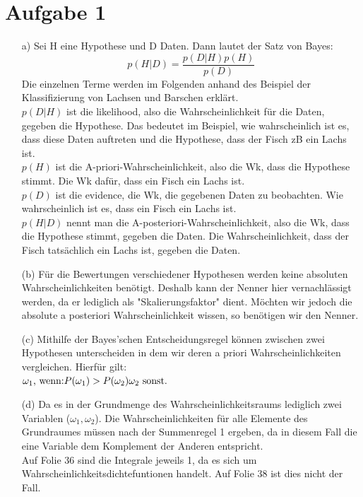 \documentclass[a4paper]{scrartcl}
\begin{document}
	
	\section*{Aufgabe 1}
	
	\begin{itemize} 
		
		\item[a)] Sei H eine Hypothese und D Daten. Dann lautet der Satz von Bayes: $$p(H|D) = \frac{p(D|H)p(H)}{p(D)}$$
		Die einzelnen Terme werden im Folgenden anhand des Beispiel der Klassifizierung von Lachsen und Barschen erklärt.\\
		$p(D|H)$ ist die likelihood, also die Wahrscheinlichkeit für die Daten, gegeben die Hypothese. Das bedeutet im Beispiel, wie wahrscheinlich ist es, dass diese Daten auftreten und die Hypothese, dass der Fisch zB ein Lachs ist.\\
		$p(H)$ ist die A-priori-Wahrscheinlichkeit, also die Wk, dass die Hypothese stimmt. Die Wk dafür, dass ein Fisch ein Lachs ist.\\
		$p(D)$ ist die evidence, die Wk, die gegebenen Daten zu beobachten. Wie wahrscheinlich ist es, dass ein Fisch ein Lachs ist.\\
		$p(H|D)$ nennt man die A-posteriori-Wahrscheinlichkeit, also die Wk, dass die Hypothese stimmt, gegeben die Daten. Die Wahrscheinlichkeit, dass der Fisch tatsächlich ein Lachs ist, gegeben die Daten.
		
		
		\item[(b)] Für die Bewertungen verschiedener Hypothesen werden keine absoluten Wahrscheinlichkeiten benötigt. Deshalb kann der Nenner hier vernachlässigt werden, da er lediglich als "Skalierungsfaktor" dient. Möchten wir jedoch die absolute a posteriori Wahrscheinlichkeit wissen, so benötigen wir den Nenner.
		
		
		
		\item[(c)]
		Mithilfe der Bayes'schen Entscheidungsregel können zwischen zwei Hypothesen unterscheiden in dem wir deren a priori Wahrscheinlichkeiten vergleichen. Hierfür gilt:\\
		$
		\omega_1 \text{, wenn:} P(\omega_1) > P(\omega_2)\\
		\omega_2 \text{ sonst.}
		$
		
		
		
		\item[(d)]
		Da es in der Grundmenge des Wahrscheinlichkeitsraums lediglich zwei Variablen ($\omega_1, \omega_2$). Die Wahrscheinlichkeiten für alle Elemente des Grundraumes müssen nach der Summenregel 1 ergeben, da 
		in diesem Fall die eine Variable dem Komplement der Anderen entspricht.
		\\
		Auf Folie 36 sind die Integrale jeweils 1, da es sich um Wahrscheinlichkeitsdichtefuntionen handelt. Auf Folie 38 ist dies nicht der Fall.
		

\end{itemize}
\end{document}

